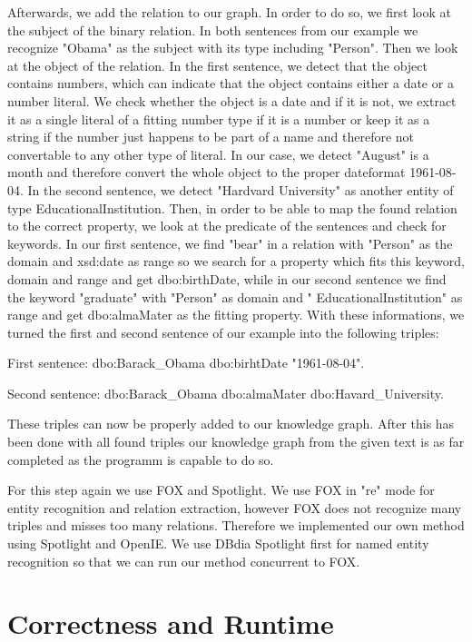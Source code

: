 \documentclass[runningheads]{llncs}
\begin{document}
Afterwards, we add the relation to our graph. In order to do so, we first look at the subject of the binary relation. In both sentences from our example we recognize "Obama" as the subject with its type including "Person". Then we look at the object of the relation. In the first sentence, we detect that the object contains numbers, which can indicate that the object contains either a date or a number literal. We check whether the object is a date and if it is not, we extract it as a single literal of a fitting number type if it is a number or keep it as a string if the number just happens to be part of a name and therefore not convertable to any other type of literal. In our case, we detect "August" is a month and therefore convert the whole object to the proper dateformat 1961-08-04. In the second sentence, we detect "Hardvard University" as another entity of type EducationalInstitution. Then, in order to be able to map the found relation to the correct property, we look at the predicate of the sentences and check for keywords. In our first sentence, we find "bear" in a relation with "Person" as the domain and xsd:date as range so we search for a property which fits this keyword, domain and range and get dbo:birthDate, while in our second sentence we find the keyword "graduate" with "Person" as domain and " EducationalInstitution" as range and get dbo:almaMater as the fitting property. With these informations, we turned the first and second sentence of our example into the following triples:
\begin{example} First sentence: dbo:Barack\_Obama dbo:birhtDate "1961-08-04".
	
	Second sentence: dbo:Barack\_Obama dbo:almaMater dbo:Havard\_University.\end{example}

These triples can now be properly added to our knowledge graph. After this has been done with all found triples our knowledge graph from the given text is as far completed as the programm is capable to do so.

For this step again we use FOX and Spotlight. We use FOX in "re" mode for entity recognition and relation extraction, however FOX does not recognize many triples and misses too many relations. Therefore we implemented our own method using Spotlight and OpenIE.
We use DBdia Spotlight first for named entity recognition so that we can run our method concurrent to FOX. 

\section{Correctness and Runtime}
\end{document}
